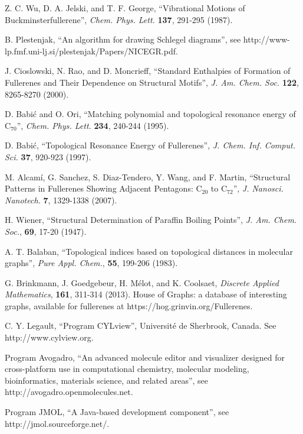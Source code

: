 \documentclass[article,a4paper,twoside]{memoir}
\newcommand{\C}[1]{\ensuremath{\mathrm{C}_{#1}}}
\begin{document}
\begin{thebibliography}{99}
 Z. C. Wu, D. A. Jelski, and T. F. George, ``Vibrational Motions of
Buckminsterfullerene'', \textit{Chem. Phys. Lett.} \textbf{137}, 291-295 (1987).

 B. Plestenjak, ``An algorithm for drawing Schlegel diagrams'', see http://www-lp.fmf.uni-lj.si/plestenjak/Papers/NICEGR.pdf.

 J. Cioslowski, N. Rao, and D. Moncrieff, ``Standard Enthalpies of Formation of Fullerenes and Their
Dependence on Structural Motifs'', \textit{J. Am. Chem. Soc.} \textbf{122}, 8265-8270 (2000).

 D. Babi\'c and O. Ori, ``Matching polynomial and topological resonance energy of \C{70}'', \textit{Chem. Phys. Lett.} \textbf{234}, 240-244 (1995).

 D. Babi\'c, ``Topological Resonance Energy of Fullerenes'', \textit{J. Chem. Inf. Comput. Sci.} \textbf{37}, 920-923 (1997).

 M. Alcam\'i, G. Sanchez, S. Diaz-Tendero, Y. Wang, and F. Martin, ``Structural Patterns in Fullerenes Showing
Adjacent Pentagons: \C{20} to \C{72}'', \textit{J. Nanosci. Nanotech.} \textbf{7}, 1329-1338 (2007).

 H. Wiener, ``Structural Determination of Paraffin Boiling Points'', \textit{J. Am. Chem. Soc.}, \textbf{69}, 17-20 (1947).

 A. T. Balaban, ``Topological indices based on topological distances in molecular graphs'', \textit{Pure Appl. Chem.}, \textbf{55}, 199-206 (1983).

 G. Brinkmann,  J. Goedgebeur, H. M\'elot, and K. Coolsaet, \textit{Discrete Applied Mathematics}, \textbf{161}, 311-314 (2013). 
House of Graphs: a database of interesting graphs, available for fullerenes at https://hog.grinvin.org/Fullerenes.

 C. Y. Legault, ``Program CYLview'', Universit\'e de Sherbrook, Canada. See http://www.cylview.org.

 Program Avogadro, ``An advanced molecule editor and visualizer designed for cross-platform use in computational chemistry, molecular modeling, bioinformatics, materials science, and related areas'', see http://avogadro.openmolecules.net.

 Program JMOL, ``A Java-based development component'', see http://jmol.sourceforge.net/.


\end{thebibliography}
\end{document}
